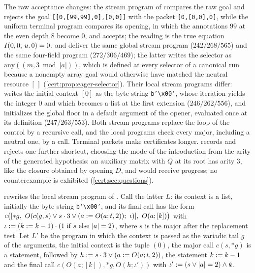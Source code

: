 The raw acceptance changes: the stream program of 
compares the raw goal and rejects the goal \texttt{[[0,[99,99],0],[0,0]]} with
the packet \texttt{[0,[0,0],0]}, while the uniform terminal program compares
its opening, in which the annotations $99$ at the even depth $8$ become $0$,
and accepts; the reading is the true equation $I(0,0;\,u.\,0)=0$.
 and  deliver the same global stream
program ($242/268/565$) and the same four-field program ($272/306/469$); the
latter writes the selector as $\mathrm{any}((m,3\bmod\lvert a\rvert))$, which
is defined at every selector of a canonical run because a nonempty array goal
would otherwise have matched the neutral resource $[\,]$
(\cref{cert:prop:eager-selector}). Their local stream programs differ:
 writes the initial context $[0]$ as the byte string
\texttt{b'\textbackslash x00'}, whose iteration yields the integer $0$ and
which becomes a list at the first extension ($246/262/556$), and
 initializes the global floor in a default argument of
the opener, evaluated once at its definition ($247/263/553$). Both stream
programs replace the loop of the control by a recursive call, and the local
programs check every major, including a neutral one, by a call. Terminal
packets make certificates longer.  records and rejects one
further shortcut, choosing the mode of the introduction from the arity of the
generated hypothesis: an auxiliary matrix with $Q$ at its root has arity $3$,
like the closure obtained by opening $D$, and would receive progress; no
counterexample is exhibited (\cref{cert:sec:questions}).

 rewrites the local stream program of
. Call the latter $L$: its context is a list, initially the
byte string \texttt{b'\textbackslash x00'}, and its final call has the form
$c\bigl([{*}g,\ O(c(g,s)\lor s\cdot 3\lor(a\mathrel{:=} O(a;t,2));\ \iota)],\ O(a;[k])\bigr)$
with $\iota\defeq(k\defeq k-1)\cdot(1\ \text{if}\ s\ \text{else}\ \lvert a\rvert=2)$,
where $s$ is the major after the replacement test. Let $L'$ be the program in
which the context is passed as the variadic tail $g$ of the arguments, the
initial context is the tuple $(0)$, the major call $c(s,{*}g)$ is a statement,
followed by $h\mathrel{:=} s\cdot 3\lor(a\mathrel{:=} O(a;t,2))$, the statement $k\mathrel{:=} k-1$
and the final call $c(O(a;[k]),{*}g,O(h;\iota'))$ with
$\iota'\mathrel{:=}(s\lor\lvert a\rvert=2)\land k$.

